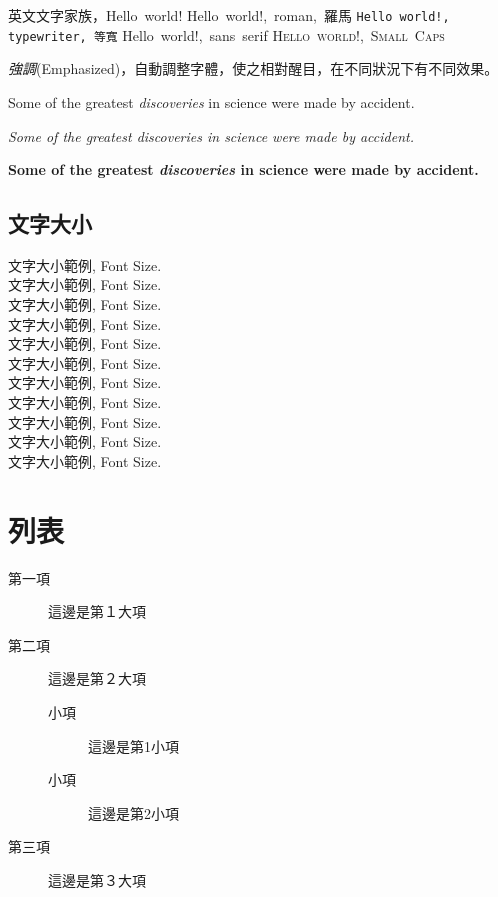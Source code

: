 \hbox{英文文字家族，Hello world!}
{\LARGE
    \hbox{\textrm{Hello world!, roman, 羅馬}}
    \hbox{\texttt{Hello world!, typewriter, 等寬}}
    \hbox{\textsf{Hello world!, sans serif}}
    \hbox{\textsc{Hello world!, Small Caps}}
}

\emph{強調}(Emphasized)，自動調整字體，使之相對醒目，在不同狀況下有不同效果。

Some of the greatest \emph{discoveries}
in science
were made by accident.

\textit{Some of the greatest \emph{discoveries}
    in science
    were made by accident.}

\textbf{Some of the greatest \emph{discoveries}
    in science
    were made by accident.}

\subsection{文字大小}
文字大小範例, Font Size.\\
{\tiny 文字大小範例, Font Size.}\\
{\scriptsize 文字大小範例, Font Size.}\\
{\footnotesize 文字大小範例, Font Size.}\\
{\small 文字大小範例, Font Size.}\\
{\normalsize 文字大小範例, Font Size.}\\
{\large 文字大小範例, Font Size.}\\
{\Large 文字大小範例, Font Size.}\\
{\LARGE 文字大小範例, Font Size.}\\
{\huge 文字大小範例, Font Size.} \\
{\Huge 文字大小範例, Font Size.}

\newpage

\section{列表} \label{sec_item}

\begin{description}
    \item[第一項] 這邊是第１大項
    \item[第二項] 這邊是第２大項
          \begin{description}
              \item[小項] 這邊是第1小項
              \item[小項] 這邊是第2小項
          \end{description}
    \item[第三項] 這邊是第３大項
\end{description}

